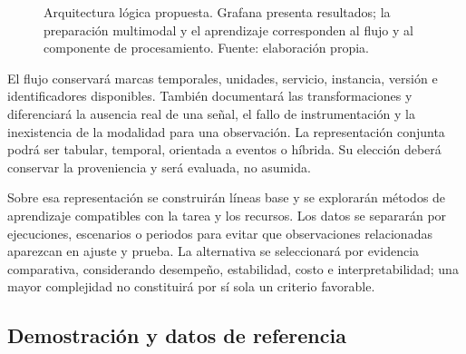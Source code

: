 \documentclass[conference]{IEEEtran}
\begin{document}
\begin{figure}[t]
\centering
{}
\caption{Arquitectura lógica propuesta. Grafana presenta resultados; la preparación multimodal y el aprendizaje corresponden al flujo y al componente de procesamiento. Fuente: elaboración propia.}
\label{fig:arquitectura}
\end{figure}

El flujo conservará marcas temporales, unidades, servicio, instancia, versión e identificadores disponibles. También documentará las transformaciones y diferenciará la ausencia real de una señal, el fallo de instrumentación y la inexistencia de la modalidad para una observación. La representación conjunta podrá ser tabular, temporal, orientada a eventos o híbrida. Su elección deberá conservar la proveniencia y será evaluada, no asumida.

Sobre esa representación se construirán líneas base y se explorarán métodos de aprendizaje compatibles con la tarea y los recursos. Los datos se separarán por ejecuciones, escenarios o periodos para evitar que observaciones relacionadas aparezcan en ajuste y prueba. La alternativa se seleccionará por evidencia comparativa, considerando desempeño, estabilidad, costo e interpretabilidad; una mayor complejidad no constituirá por sí sola un criterio favorable.

\subsection{Demostración y datos de referencia}
\end{document}
